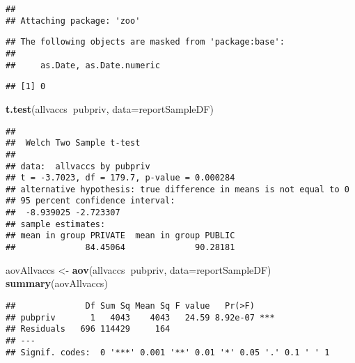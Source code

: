 \documentclass[]{article}
\newenvironment{Shaded}{\begin{snugshade}}{\end{snugshade}}
\newcommand{\DataTypeTok}[1]{\textcolor[rgb]{0.13,0.29,0.53}{#1}}
\newcommand{\KeywordTok}[1]{\textcolor[rgb]{0.13,0.29,0.53}{\textbf{#1}}}
\newcommand{\NormalTok}[1]{#1}
\newcommand{\OperatorTok}[1]{\textcolor[rgb]{0.81,0.36,0.00}{\textbf{#1}}}
\newcommand{\StringTok}[1]{\textcolor[rgb]{0.31,0.60,0.02}{#1}}
\begin{document}
\begin{verbatim}
## 
## Attaching package: 'zoo'
\end{verbatim}

\begin{verbatim}
## The following objects are masked from 'package:base':
## 
##     as.Date, as.Date.numeric
\end{verbatim}

\begin{Shaded}
\end{Shaded}

\begin{verbatim}
## [1] 0
\end{verbatim}

\begin{Shaded}
\begin{Highlighting}[]
\KeywordTok{t.test}\NormalTok{(allvaccs}\OperatorTok{~}\NormalTok{pubpriv, }\DataTypeTok{data=}\NormalTok{reportSampleDF)}
\end{Highlighting}
\end{Shaded}

\begin{verbatim}
## 
##  Welch Two Sample t-test
## 
## data:  allvaccs by pubpriv
## t = -3.7023, df = 179.7, p-value = 0.000284
## alternative hypothesis: true difference in means is not equal to 0
## 95 percent confidence interval:
##  -8.939025 -2.723307
## sample estimates:
## mean in group PRIVATE  mean in group PUBLIC 
##              84.45064              90.28181
\end{verbatim}

\begin{Shaded}
\begin{Highlighting}[]
\NormalTok{aovAllvaccs <-}\StringTok{ }\KeywordTok{aov}\NormalTok{(allvaccs}\OperatorTok{~}\NormalTok{pubpriv, }\DataTypeTok{data=}\NormalTok{reportSampleDF)}
\KeywordTok{summary}\NormalTok{(aovAllvaccs)}
\end{Highlighting}
\end{Shaded}

\begin{verbatim}
##              Df Sum Sq Mean Sq F value   Pr(>F)    
## pubpriv       1   4043    4043   24.59 8.92e-07 ***
## Residuals   696 114429     164                     
## ---
## Signif. codes:  0 '***' 0.001 '**' 0.01 '*' 0.05 '.' 0.1 ' ' 1
\end{verbatim}
\end{document}
